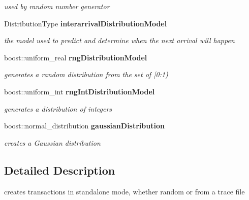 \begin{DoxyCompactItemize}
\begin{DoxyCompactList}\small\item\em used by random number generator \item\end{DoxyCompactList}\item 
DistributionType {\bf interarrivalDistributionModel}\label{class_d_r_a_msim_i_i_1_1_input_stream_ae737c9eeccab11eaf2f7226ddba00c63}

\begin{DoxyCompactList}\small\item\em the model used to predict and determine when the next arrival will happen \item\end{DoxyCompactList}\item 
boost::uniform\_\-real {\bf rngDistributionModel}\label{class_d_r_a_msim_i_i_1_1_input_stream_a8e535060eac21b385c56530f010413a6}

\begin{DoxyCompactList}\small\item\em generates a random distribution from the set of [0:1) \item\end{DoxyCompactList}\item 
boost::uniform\_\-int {\bf rngIntDistributionModel}\label{class_d_r_a_msim_i_i_1_1_input_stream_aa1344a84d478d44279a777e820dcf9cb}

\begin{DoxyCompactList}\small\item\em generates a distribution of integers \item\end{DoxyCompactList}\item 
boost::normal\_\-distribution {\bf gaussianDistribution}\label{class_d_r_a_msim_i_i_1_1_input_stream_a1932e8903b183eeb9e6fbd36b4e738ad}

\begin{DoxyCompactList}\small\item\em creates a Gaussian distribution \item\end{DoxyCompactList}\end{DoxyCompactItemize}


\subsection{Detailed Description}
creates transactions in standalone mode, whether random or from a trace file 

